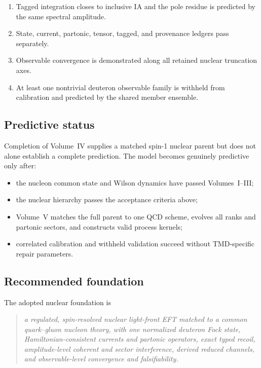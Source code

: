\documentclass[11pt]{article}
\begin{document}
\begin{enumerate}
      unresolved coherence.
\item Tagged integration closes to inclusive IA and the pole residue is
      predicted by the same spectral amplitude.
\item State, current, partonic, tensor, tagged, and provenance ledgers pass
      separately.
\item Observable convergence is demonstrated along all retained nuclear
      truncation axes.
\item At least one nontrivial deuteron observable family is withheld from
      calibration and predicted by the shared member ensemble.
\end{enumerate}

\subsection{Predictive status}

Completion of Volume~IV supplies a matched spin-1 nuclear parent but does not
alone establish a complete prediction.  The model becomes genuinely
predictive only after:
\begin{itemize}
\item the nucleon common state and Wilson dynamics have passed Volumes~I--III;
\item the nuclear hierarchy passes the acceptance criteria above;
\item Volume~V matches the full parent to one QCD scheme, evolves all ranks and
      partonic sectors, and constructs valid process kernels;
\item correlated calibration and withheld validation succeed without
      TMD-specific repair parameters.
\end{itemize}

\subsection{Recommended foundation}

The adopted nuclear foundation is
\begin{quote}
\emph{a regulated, spin-resolved nuclear light-front EFT matched to a common
quark--gluon nucleon theory, with one normalized deuteron Fock state,
Hamiltonian-consistent currents and partonic operators, exact typed recoil,
amplitude-level coherent and sector interference, derived reduced channels,
and observable-level convergence and falsifiability.}
\end{quote}
\end{document}
